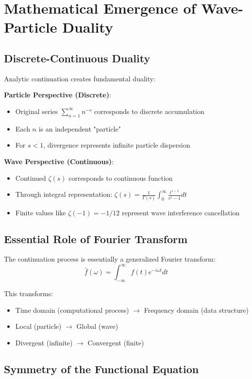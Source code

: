 \documentclass[11pt]{article}
\begin{document}
\section{Mathematical Emergence of Wave-Particle Duality}

\subsection{Discrete-Continuous Duality}

Analytic continuation creates fundamental duality:

\textbf{Particle Perspective (Discrete)}:
\begin{itemize}
\item Original series $\sum_{n=1}^{\infty} n^{-s}$ corresponds to discrete accumulation
\item Each $n$ is an independent "particle"
\item For $s < 1$, divergence represents infinite particle dispersion
\end{itemize}

\textbf{Wave Perspective (Continuous)}:
\begin{itemize}
\item Continued $\zeta(s)$ corresponds to continuous function
\item Through integral representation: $\zeta(s) = \frac{1}{\Gamma(s)} \int_0^{\infty} \frac{t^{s-1}}{e^t - 1} dt$
\item Finite values like $\zeta(-1) = -1/12$ represent wave interference cancellation
\end{itemize}

\subsection{Essential Role of Fourier Transform}

The continuation process is essentially a generalized Fourier transform:
$$\hat{f}(\omega) = \int_{-\infty}^{\infty} f(t) e^{-i\omega t} dt$$

This transforms:
\begin{itemize}
\item Time domain (computational process) $\to$ Frequency domain (data structure)
\item Local (particle) $\to$ Global (wave)
\item Divergent (infinite) $\to$ Convergent (finite)
\end{itemize}

\subsection{Symmetry of the Functional Equation}
\end{document}
